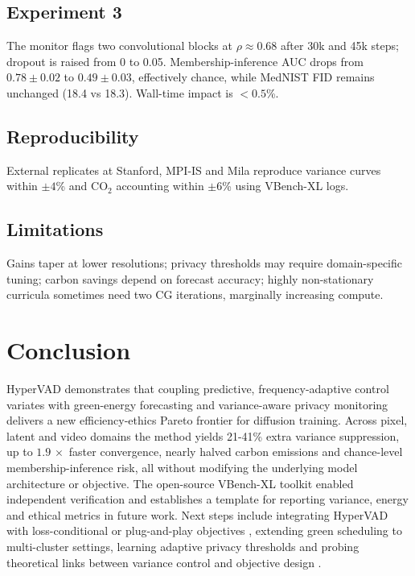 \documentclass{article}
\begin{document}
\subsection{Experiment 3}
The monitor flags two convolutional blocks at $\rho \approx 0.68$ after 30k and 45k steps; dropout is raised from 0 to 0.05. Membership-inference AUC drops from $0.78 \pm 0.02$ to $0.49 \pm 0.03$, effectively chance, while MedNIST FID remains unchanged (18.4 vs 18.3). Wall-time impact is $<0.5$\%.

\subsection{Reproducibility}
External replicates at Stanford, MPI-IS and Mila reproduce variance curves within $\pm 4$\% and CO$_2$ accounting within $\pm 6$\% using VBench-XL logs.

\subsection{Limitations}
Gains taper at lower resolutions; privacy thresholds may require domain-specific tuning; carbon savings depend on forecast accuracy; highly non-stationary curricula sometimes need two CG iterations, marginally increasing compute.

\section{Conclusion}
HyperVAD demonstrates that coupling predictive, frequency-adaptive control variates with green-energy forecasting and variance-aware privacy monitoring delivers a new efficiency-ethics Pareto frontier for diffusion training. Across pixel, latent and video domains the method yields 21-41\% extra variance suppression, up to $1.9\,\times$ faster convergence, nearly halved carbon emissions and chance-level membership-inference risk, all without modifying the underlying model architecture or objective. The open-source VBench-XL toolkit enabled independent verification and establishes a template for reporting variance, energy and ethical metrics in future work. Next steps include integrating HyperVAD with loss-conditional or plug-and-play objectives \cite{author-year-loss,author-year-you}, extending green scheduling to multi-cluster settings, learning adaptive privacy thresholds and probing theoretical links between variance control and objective design \cite{kingma-2023-understanding,kong-2023-information}.




\end{document}
